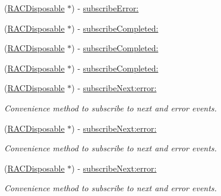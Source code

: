 \begin{DoxyCompactItemize}
\item 
(\mbox{\hyperlink{interface_r_a_c_disposable}{R\+A\+C\+Disposable}} $\ast$) -\/ \mbox{\hyperlink{interface_r_a_c_signal_a6e792da9c8499ad5791e14bd126e99cb}{subscribe\+Error\+:}}
\item 
(\mbox{\hyperlink{interface_r_a_c_disposable}{R\+A\+C\+Disposable}} $\ast$) -\/ \mbox{\hyperlink{interface_r_a_c_signal_a3927c94bfca5db9dad133dd7c45563f3}{subscribe\+Completed\+:}}
\item 
(\mbox{\hyperlink{interface_r_a_c_disposable}{R\+A\+C\+Disposable}} $\ast$) -\/ \mbox{\hyperlink{interface_r_a_c_signal_a3927c94bfca5db9dad133dd7c45563f3}{subscribe\+Completed\+:}}
\item 
(\mbox{\hyperlink{interface_r_a_c_disposable}{R\+A\+C\+Disposable}} $\ast$) -\/ \mbox{\hyperlink{interface_r_a_c_signal_a3927c94bfca5db9dad133dd7c45563f3}{subscribe\+Completed\+:}}
\item 
\mbox{\label{interface_r_a_c_signal_a2fc221c95206c024d074a23cf7efc480}} 
(\mbox{\hyperlink{interface_r_a_c_disposable}{R\+A\+C\+Disposable}} $\ast$) -\/ \mbox{\hyperlink{interface_r_a_c_signal_a2fc221c95206c024d074a23cf7efc480}{subscribe\+Next\+:error\+:}}
\begin{DoxyCompactList}\small\item\em Convenience method to subscribe to {\ttfamily next} and {\ttfamily error} events. \end{DoxyCompactList}\item 
\mbox{\label{interface_r_a_c_signal_a2fc221c95206c024d074a23cf7efc480}} 
(\mbox{\hyperlink{interface_r_a_c_disposable}{R\+A\+C\+Disposable}} $\ast$) -\/ \mbox{\hyperlink{interface_r_a_c_signal_a2fc221c95206c024d074a23cf7efc480}{subscribe\+Next\+:error\+:}}
\begin{DoxyCompactList}\small\item\em Convenience method to subscribe to {\ttfamily next} and {\ttfamily error} events. \end{DoxyCompactList}\item 
\mbox{\label{interface_r_a_c_signal_a2fc221c95206c024d074a23cf7efc480}} 
(\mbox{\hyperlink{interface_r_a_c_disposable}{R\+A\+C\+Disposable}} $\ast$) -\/ \mbox{\hyperlink{interface_r_a_c_signal_a2fc221c95206c024d074a23cf7efc480}{subscribe\+Next\+:error\+:}}
\begin{DoxyCompactList}\small\item\em Convenience method to subscribe to {\ttfamily next} and {\ttfamily error} events. \end{DoxyCompactList}\item 

\end{DoxyCompactItemize}
